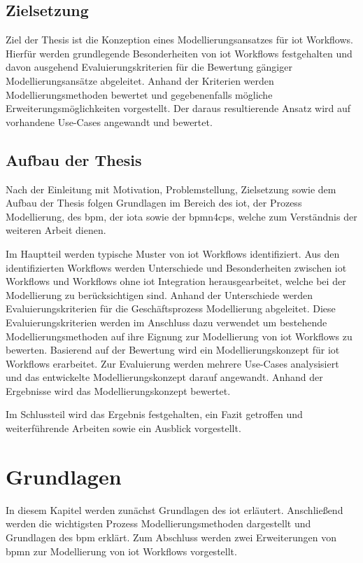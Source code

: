 \documentclass[a4paper, 12pt, twoside, headsepline=true]{scrartcl} %
\begin{document}
\subsection{Zielsetzung}
Ziel der Thesis ist die Konzeption eines Modellierungsansatzes für \ac{iot}
Workflows. Hierfür werden grundlegende Besonderheiten von \ac{iot} Workflows festgehalten und davon ausgehend Evaluierungskriterien für die Bewertung gängiger Modellierungsansätze abgeleitet. Anhand der Kriterien werden Modellierungsmethoden bewertet und gegebenenfalls mögliche Erweiterungsmöglichkeiten vorgestellt. Der daraus resultierende Ansatz wird auf vorhandene Use-Cases angewandt und bewertet.

\subsection{Aufbau der Thesis}
Nach der Einleitung mit Motivation, Problemstellung, Zielsetzung sowie dem Aufbau der Thesis folgen Grundlagen im Bereich des \ac{iot}, der Prozess Modellierung, des \ac{bpm}, der \ac{iota} sowie der \ac{bpmn4cps}, welche zum Verständnis der weiteren Arbeit dienen.
 
 Im Hauptteil werden typische Muster von \ac{iot} Workflows identifiziert. Aus den identifizierten Workflows werden Unterschiede und Besonderheiten zwischen \ac{iot} Workflows und Workflows ohne \ac{iot} Integration herausgearbeitet, welche bei der Modellierung zu berücksichtigen sind.
 Anhand der Unterschiede werden Evaluierungskriterien für die Geschäftsprozess Modellierung abgeleitet. Diese Evaluierungskriterien werden im Anschluss dazu verwendet um bestehende Modellierungsmethoden auf ihre Eignung zur Modellierung von \ac{iot} Workflows zu bewerten. Basierend auf der Bewertung wird ein Modellierungskonzept für \ac{iot} Workflows erarbeitet. Zur Evaluierung werden mehrere Use-Cases analysisiert und das entwickelte Modellierungskonzept darauf angewandt. Anhand der Ergebnisse wird das Modellierungskonzept bewertet.
 
Im Schlussteil wird das Ergebnis festgehalten, ein Fazit getroffen und weiterführende Arbeiten sowie ein Ausblick vorgestellt.
 
\newpage

\section{Grundlagen} \label{sec:section2}
In diesem Kapitel werden zunächst Grundlagen des \ac{iot} erläutert. Anschließend werden die wichtigsten Prozess Modellierungsmethoden dargestellt und Grundlagen des \ac{bpm} erklärt. Zum Abschluss werden zwei Erweiterungen von \ac{bpmn} zur Modellierung von \ac{iot} Workflows vorgestellt.
\end{document}
